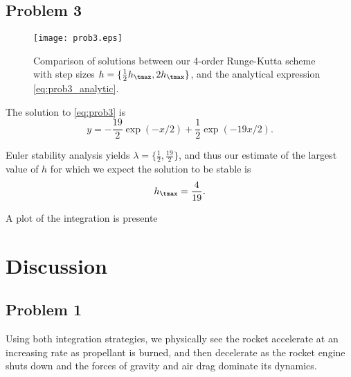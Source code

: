 \documentclass[12pt]{article}
\begin{document}
\subsection{Problem 3}

\begin{figure}[t]
\begin{center}
\texttt{[image: prob3.eps]}
\\[6pt]
\caption{Comparison of solutions between our 4\nd-order Runge-Kutta scheme with step sizes $h = \{ \tfrac{1}{2} h_\tmax, 2 h_\tmax \}$, and the analytical expression \eqref{eq:prob3_analytic}.}
\label{fig:rocket_plots}
\end{center}
\end{figure}

The solution to \eqref{eq:prob3} is
\begin{equation}
y = -\frac{19}{2} \exp(-x/2) + \frac{1}{2} \exp(-19x/2)
.
\label{eq:prob3_analytic}
\end{equation}

Euler stability analysis yields $\lambda = \{ \tfrac{1}{2}, \tfrac{19}{2} \}$, and thus our estimate of the largest value of $h$ for which we expect the solution to be stable is
\begin{equation}
h_\tmax = \frac{4}{19}
.
\end{equation}

A plot of the integration is presente

\section{Discussion} %

\subsection*{Problem 1}

Using both integration strategies, we physically see the rocket accelerate at an increasing rate as propellant is burned, and then decelerate as the rocket engine shuts down and the forces of gravity and air drag dominate its dynamics. 
\end{document}
